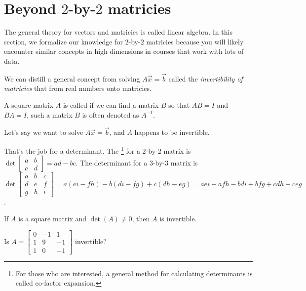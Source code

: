 \documentclass[../main.tex]{subfiles}
\begin{document}
 \section{Beyond \texorpdfstring{\(2\)-by-\(2\)}{2-by-2} matricies}

The general theory for vectors and matricies is called linear algebra. In this section, we formalize our knowledge for \(2\)-by-\(2\) matricies because you will likely encounter similar concepts in high dimensions in courses that work with lots of data. 

We can distill a general concept from solving \(A \vec{x} = \vec{b}\) called the \emph{invertibility of matricies} that  from real numbers onto matricies.

\faStar{} A square matrix \(A\) is called  if we can find a matrix \(B\) so that \(AB = I\) and \(BA = I\), such a matrix \(B\) is often denoted as \(A^{-1}\). 

  Let's say we want to solve \(A \vec{x} = \vec{b}\), and \(A\) happens to be invertible. 

 That's the job for a determinant. The \footnote{For those who are interested, a general method for calculating determinants is called co-factor expansion.} for a \(2\)-by-\(2\) matrix is \(\det \begin{bmatrix} a & b \\ c & d \end{bmatrix} = ad - bc\).  The determinant for a \(3\)-by-\(3\) matrix is \(\det \begin{bmatrix} a & b & c \\ d & e & f \\ g & h & i\end{bmatrix} = a (ei - fh) - b (di - fg) + c (dh - eg) = aei - afh - bdi + bfg + cdh - ceg \). 

\faStar{} If \(A\) is a square matrix and \(\det(A) \ne 0\), then \(A\) is invertible. 

\begin{example}
  Is \(A = \begin{bmatrix} 0 & -1 & 1 \\ 1 & 9 & -1 \\ 1 & 0 & -1\end{bmatrix}\) invertible?
\end{example}
\clearpage
\end{document}
